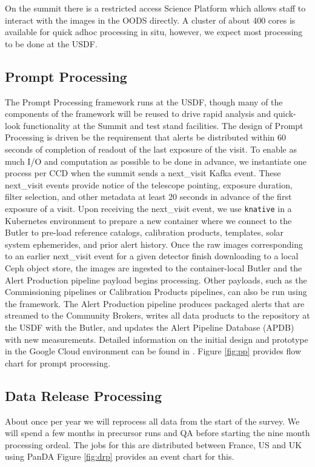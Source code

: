 \documentclass[11pt,twoside]{article}
\begin{document}
On the summit there is a restricted access Science Platform which allows staff to interact with the images in the OODS directly.
A cluster of about 400 cores is available for quick adhoc processing in situ, however, we expect most processing to be done at the USDF.

\subsection{Prompt Processing} \label{sec:prompt}
The Prompt Processing framework runs at the USDF, though many of the components of the framework will be reused to drive rapid analysis and quick-look functionality at the Summit and test stand facilities.
The design of Prompt Processing is driven be the requirement that alerts be distributed within 60 seconds of completion of readout of the last exposure of the visit.
To enable as much I/O and computation as possible to be done in advance, we instantiate one process per CCD when the summit sends a next\_visit Kafka event.
These next\_visit events provide notice of the telescope pointing, exposure duration, filter selection, and other metadata at least 20 seconds in advance of the first exposure of a visit.
Upon receiving the next\_visit event, we use \texttt{knative} in a Kubernetes environment to prepare a new container where we connect to the Butler to pre-load reference catalogs, calibration products, templates, solar system ephemerides, and prior alert history.
Once the raw images corresponding to an earlier next\_visit event for a given detector finish downloading to a local Ceph object store, the images are ingested to the container-local Butler and the Alert Production pipeline payload begins processing.
Other payloads, such as the Commissioning pipelines or Calibration Products pipelines, can also be run using the framework.
The Alert Production pipeline produces packaged alerts that are streamed to the Community Brokers, writes all data products to the repository at the USDF with the Butler, and updates the Alert Pipeline Database (APDB) with new measurements.
Detailed information on the initial design and prototype in the Google Cloud environment can be found in \citet{DMTN-219}.
Figure \ref{fig:pp} provides flow chart for prompt processing.

\begin{centering}
\end{centering}

\subsection{Data Release Processing}\label{sec:DRP}
About once per year we will reprocess all data from the start of the survey.
We will spend a few months in precursor runs and QA before starting the nine month processing ordeal.
The jobs for this are distributed between France, US and UK using PanDA \citep{DMTN-213}
Figure \ref{fig:drp} provides an event chart for this.
\end{document}

